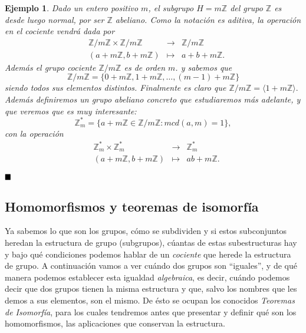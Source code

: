 \documentclass[12pt]{article}
\newtheorem{example}{Ejemplo}[theorem]
\begin{document}
\begin{example}
Dado un entero positivo $m$, el subgrupo $H = m\mathbb{Z}$ del grupo $\mathbb{Z}$ es desde luego normal, por ser $\mathbb{Z}$ abeliano. Como la notación es aditiva, la operación en el cociente vendrá dada por $$\begin{array}{rccl}
&\mathbb{Z}/m\mathbb{Z} \times \mathbb{Z}/m\mathbb{Z} & \longrightarrow & \mathbb{Z}/m\mathbb{Z}\\
&(a+m\mathbb{Z}, b+m\mathbb{Z}) & \longmapsto &a+b+m\mathbb{Z}.
\end{array}
$$
Además el grupo cociente $\mathbb{Z}/m\mathbb{Z}$ es de orden $m$. y sabemos que $$\mathbb{Z}/m\mathbb{Z} = \lbrace 0+m\mathbb{Z}, 1+m\mathbb{Z}, \ldots, (m-1)+m\mathbb{Z}\rbrace$$ siendo todos sus elementos distintos. Finalmente es claro que $\mathbb{Z}/m\mathbb{Z} = \langle 1+m\mathbb{Z}\rangle.$ Además definiremos un grupo abeliano concreto que estudiaremos más adelante, y que veremos que es muy interesante:
$$\mathbb{Z}_{m}^{\ast} = \lbrace a+m\mathbb{Z} \in \mathbb{Z}/m\mathbb{Z} : mcd(a,m) = 1\rbrace,$$
con la operación 
$$\begin{array}{rccl}
&\mathbb{Z}_{m}^{\ast} \times \mathbb{Z}_{m}^{\ast} & \longrightarrow & \mathbb{Z}_{m}^{\ast}\\
&(a+m\mathbb{Z}, b+m\mathbb{Z}) & \longmapsto &ab+m\mathbb{Z}.
\end{array}
$$
\end{example}

$\hfill \blacksquare$

\subsection{Homomorfismos y teoremas de isomorfía}

Ya sabemos lo que son los grupos, cómo se subdividen y si estos subconjuntos heredan la estructura de grupo (subgrupos), cúantas de estas subestructuras hay y bajo qué condiciones podemos hablar de un \textit{cociente} que herede la estructura de grupo. A continuación vamos a ver cuándo dos grupos son ``iguales'', y de qué manera podemos establecer esta igualdad \textit{algebraica}, es decir, cuándo podemos decir que dos grupos tienen la misma estructura y que, salvo los nombres que les demos a sus elementos, son el mismo. De ésto se ocupan los conocidos \textit{Teoremas de Isomorfía}, para los cuales tendremos antes que presentar y definir qué son los homomorfismos, las aplicaciones que conservan la estructura.
\end{document}
